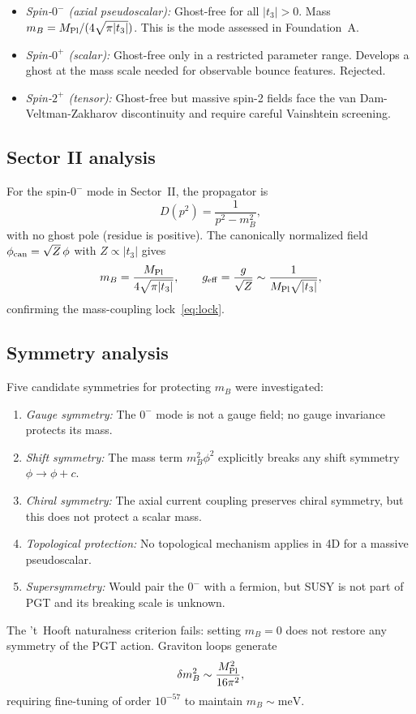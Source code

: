 \documentclass[aps,prd,twocolumn,superscriptaddress,showpacs,preprintnumbers,
  nofootinbib,longbibliography,floatfix]{revtex4-2}
\newcommand{\MPl}{M_{\rm Pl}}
\newcommand{\geff}{g_{\rm eff}}
\begin{document}
\begin{itemize}[leftmargin=*]
  \item \textit{Spin-$0^-$ (axial pseudoscalar):} Ghost-free for all
    $|t_3| > 0$. Mass $m_B = \MPl/(4\sqrt{\pi|t_3|})$. This is the mode
    assessed in Foundation~A.
  \item \textit{Spin-$0^+$ (scalar):} Ghost-free only in a restricted
    parameter range. Develops a ghost at the mass scale needed for
    observable bounce features. Rejected.
  \item \textit{Spin-$2^+$ (tensor):} Ghost-free but massive spin-2
    fields face the van Dam-Veltman-Zakharov discontinuity and require
    careful Vainshtein screening.
\end{itemize}

\subsection{Sector II analysis}

For the spin-$0^-$ mode in Sector~II, the propagator is
\begin{equation}
  D(p^2) = \frac{1}{p^2 - m_B^2},
\end{equation}
with no ghost pole (residue is positive). The canonically normalized
field $\phi_{\rm can} = \sqrt{Z}\,\phi$ with $Z \propto |t_3|$ gives
\begin{equation}
  m_B = \frac{\MPl}{4\sqrt{\pi|t_3|}}, \qquad
  \geff = \frac{g}{\sqrt{Z}} \sim \frac{1}{\MPl\sqrt{|t_3|}},
\end{equation}
confirming the mass-coupling lock~\eqref{eq:lock}.

\subsection{Symmetry analysis}

Five candidate symmetries for protecting $m_B$ were investigated:
\begin{enumerate}[leftmargin=*]
  \item \textit{Gauge symmetry:} The $0^-$ mode is not a gauge field;
    no gauge invariance protects its mass.
  \item \textit{Shift symmetry:} The mass term $m_B^2\phi^2$ explicitly
    breaks any shift symmetry $\phi \to \phi + c$.
  \item \textit{Chiral symmetry:} The axial current coupling preserves
    chiral symmetry, but this does not protect a scalar mass.
  \item \textit{Topological protection:} No topological mechanism
    applies in 4D for a massive pseudoscalar.
  \item \textit{Supersymmetry:} Would pair the $0^-$ with a fermion,
    but SUSY is not part of PGT and its breaking scale is unknown.
\end{enumerate}
The 't~Hooft naturalness criterion fails: setting $m_B = 0$ does not
restore any symmetry of the PGT action. Graviton loops generate
\begin{equation}
  \delta m_B^2 \sim \frac{\MPl^2}{16\pi^2},
\end{equation}
requiring fine-tuning of order $10^{-57}$ to maintain $m_B \sim
\text{meV}$.
\end{document}
